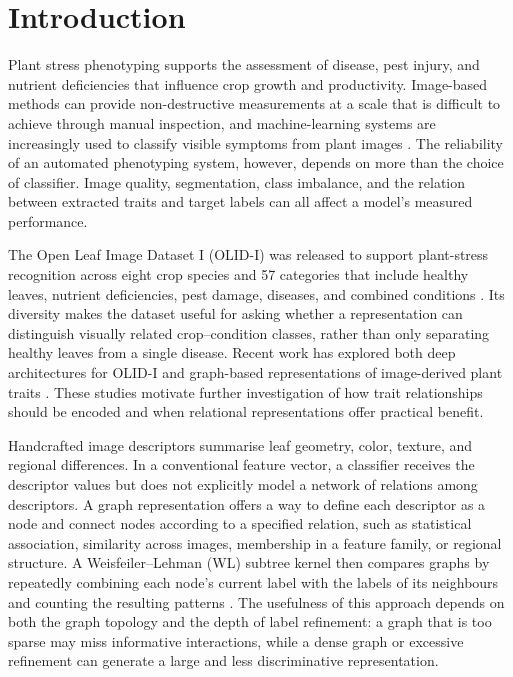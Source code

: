 \documentclass[conference]{IEEEtran}
\begin{document}
\section{Introduction}

Plant stress phenotyping supports the assessment of disease, pest injury, and nutrient deficiencies that influence crop growth and productivity. Image-based methods can provide non-destructive measurements at a scale that is difficult to achieve through manual inspection, and machine-learning systems are increasingly used to classify visible symptoms from plant images \cite{Mohanty2016,Gill2022,Pacal2024}. The reliability of an automated phenotyping system, however, depends on more than the choice of classifier. Image quality, segmentation, class imbalance, and the relation between extracted traits and target labels can all affect a model's measured performance.

The Open Leaf Image Dataset I (OLID-I) was released to support plant-stress recognition across eight crop species and 57 categories that include healthy leaves, nutrient deficiencies, pest damage, diseases, and combined conditions \cite{Orka2023}. Its diversity makes the dataset useful for asking whether a representation can distinguish visually related crop--condition classes, rather than only separating healthy leaves from a single disease. Recent work has explored both deep architectures for OLID-I and graph-based representations of image-derived plant traits \cite{Karthikeyan2026,Sriram2026}. These studies motivate further investigation of how trait relationships should be encoded and when relational representations offer practical benefit.

Handcrafted image descriptors summarise leaf geometry, color, texture, and regional differences. In a conventional feature vector, a classifier receives the descriptor values but does not explicitly model a network of relations among descriptors. A graph representation offers a way to define each descriptor as a node and connect nodes according to a specified relation, such as statistical association, similarity across images, membership in a feature family, or regional structure. A Weisfeiler--Lehman (WL) subtree kernel then compares graphs by repeatedly combining each node's current label with the labels of its neighbours and counting the resulting patterns \cite{Shervashidze2011}. The usefulness of this approach depends on both the graph topology and the depth of label refinement: a graph that is too sparse may miss informative interactions, while a dense graph or excessive refinement can generate a large and less discriminative representation.
\end{document}
